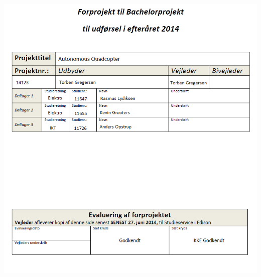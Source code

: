 \phantom{hul}
\phantom{hul}
\phantom{hul}
\phantom{hul}
\phantom{hul}

\includegraphics[width=1\textwidth]{Billeder/Forside.png}

\newpage

